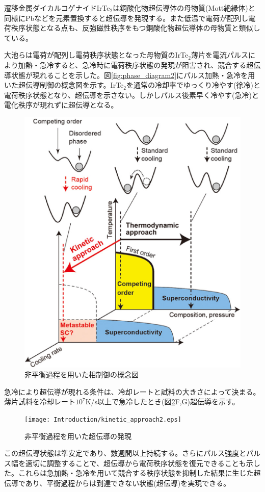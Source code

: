 遷移金属ダイカルコゲナイドIrTe$_2$は銅酸化物超伝導体の母物質(Mott絶縁体)と同様にPbなどを元素置換すると超伝導を発現する\cite{IrTe2Pd_SC}。また低温で電荷が配列し電荷秩序状態となる点も、反強磁性秩序をもつ銅酸化物超伝導体の母物質と類似している。

大池らは電荷が配列し電荷秩序状態となった母物質のIrTe$_2$薄片を電流パルスにより加熱・急冷すると、急冷時に電荷秩序状態の発現が阻害され、競合する超伝導状態が現れることを示した\cite{oike}。図\ref{fig:phase_diagram2}にパルス加熱・急冷を用いた超伝導制御の概念図を示す。IrTe$_2$を通常の冷却率でゆっくり冷やす(徐冷)と電荷秩序状態となり、超伝導を示さない。しかしパルス後素早く冷やす(急冷)と電化秩序が現れずに超伝導となる。
\begin{figure}[!h]
    \begin{center}
   \includegraphics[width=0.6\hsize]{Introduction/kinetic_approach.eps}
  \end{center}
  \caption{非平衡過程を用いた相制御の概念図}
  \label{fig:kinetic_approach}
\end{figure}

急冷により超伝導が現れる条件は、冷却レートと試料の大きさによって決まる\cite{oike,Oike_size}。薄片試料を冷却レート$10^7$K/s以上で急冷したとき(図\ref{fig:kinetic_approach2}F,G)超伝導を示す。
\begin{figure}[!h]
    \begin{center}
   \texttt{[image: Introduction/kinetic\_approach2.eps]}
  \end{center}
  \caption{非平衡過程を用いた超伝導の発現}
  \label{fig:kinetic_approach2}
\end{figure}

この超伝導状態は準安定であり、数週間以上持続する。さらにパルス強度とパルス幅を適切に調整することで、超伝導から電荷秩序状態を復元できることも示した。これらは急加熱・急冷を用いて競合する秩序状態を抑制した結果に生じた超伝導であり、平衡過程からは到達できない状態(超伝導)を実現できる。

